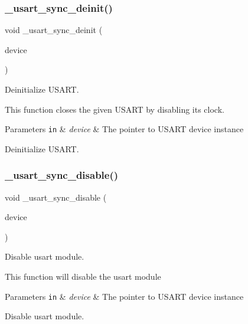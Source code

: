 \subsubsection{\texorpdfstring{\+\_\+usart\+\_\+sync\+\_\+deinit()}{\_usart\_sync\_deinit()}}
{\footnotesize\ttfamily void \+\_\+usart\+\_\+sync\+\_\+deinit (\begin{DoxyParamCaption}\item[{struct \hyperlink{struct__usart__sync__device}{\+\_\+usart\+\_\+sync\+\_\+device} $\ast$const}]{device }\end{DoxyParamCaption})}



Deinitialize U\+S\+A\+RT. 

This function closes the given U\+S\+A\+RT by disabling its clock.


\begin{DoxyParams}[1]{Parameters}
\mbox{\tt in}  & {\em device} & The pointer to U\+S\+A\+RT device instance\\
\hline
\end{DoxyParams}
Deinitialize U\+S\+A\+RT. \mbox{\label{group___h_p_l_gac021f29c77d8a9bfabfdd7433dbbb024}} 
\subsubsection{\texorpdfstring{\+\_\+usart\+\_\+sync\+\_\+disable()}{\_usart\_sync\_disable()}}
{\footnotesize\ttfamily void \+\_\+usart\+\_\+sync\+\_\+disable (\begin{DoxyParamCaption}\item[{struct \hyperlink{struct__usart__sync__device}{\+\_\+usart\+\_\+sync\+\_\+device} $\ast$const}]{device }\end{DoxyParamCaption})}



Disable usart module. 

This function will disable the usart module


\begin{DoxyParams}[1]{Parameters}
\mbox{\tt in}  & {\em device} & The pointer to U\+S\+A\+RT device instance\\
\hline
\end{DoxyParams}
Disable usart module. \mbox{\label{group___h_p_l_ga5ca07057bde212b46f6547e5bdb876de}} 
